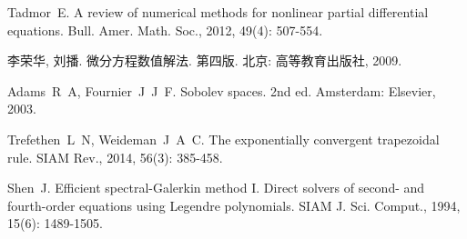 

\begin{thebibliography}{99}
 Tadmor~E. A review of numerical methods for nonlinear partial differential equations\allowbreak[J]. Bull. Amer. Math. Soc., 2012, 49(4): 507-554.

 李荣华, 刘播. 微分方程数值解法\allowbreak[M]. 第四版. 北京: 高等教育出版社, 2009.

 Adams~R~A, Fournier~J~J~F. Sobolev spaces\allowbreak[M]. 2nd ed. Amsterdam: Elsevier, 2003.

Trefethen~L~N, Weideman~J~A~C. The exponentially convergent trapezoidal rule\allowbreak[J]. SIAM Rev., 2014, 56(3): 385-458.

 Shen~J. Efficient spectral-Galerkin method I. Direct solvers of second- and fourth-order equations using Legendre polynomials\allowbreak[J]. SIAM J. Sci. Comput., 1994, 15(6): 1489-1505.

\end{thebibliography}

